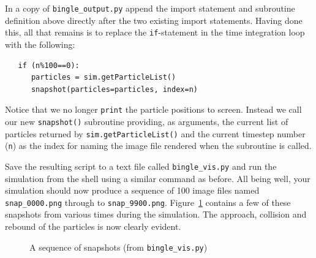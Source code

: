 In a copy of \texttt{bingle\_output.py} append the import statement and subroutine definition above directly after the two existing import statements. Having done this, all that remains is to replace the \texttt{if}-statement in the time integration loop with the following:

\begin{verbatim}
   if (n%100==0):
      particles = sim.getParticleList()
      snapshot(particles=particles, index=n)
\end{verbatim}

\noindent
Notice that we no longer \texttt{print} the particle positions to screen. Instead we call our new \texttt{snapshot()} subroutine providing, as arguments, the current list of particles returned by \texttt{sim.getParticleList()} and the current timestep number (\texttt{n}) as the index for naming the image file rendered when the subroutine is called.

Save the resulting script to a text file called \texttt{bingle\_vis.py} and run the simulation from the shell using a similar command as before. All being well, your simulation should now produce a sequence of 100 image files named \texttt{snap\_0000.png} through to \texttt{snap\_9900.png}. Figure~\ref{fig:bingle_vis} contains a few of these snapshots from various times during the simulation. The approach, collision and rebound of the particles is now clearly evident.

\begin{figure}
\begin{center}
\end{center}
\caption{A sequence of snapshots (from \texttt{bingle\_vis.py})} \label{fig:bingle_vis}
\end{figure}

